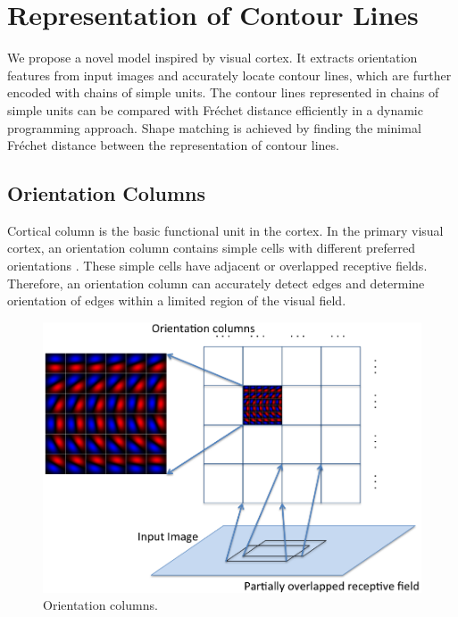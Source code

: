 \documentclass[10pt,letterpaper]{article}
\begin{document}
\section{Representation of Contour Lines}

We propose a novel model inspired by visual cortex.
It extracts orientation features from input images
and accurately locate contour lines, which are further encoded
with chains of simple units.
The contour lines represented in chains of simple units 
can be compared with Fr\'echet distance efficiently
in a dynamic programming approach.
Shape matching is achieved by finding the minimal Fr\'echet distance
between the representation of contour lines.

\subsection{Orientation Columns}

Cortical column is the basic functional unit in the cortex.
In the primary visual cortex, an orientation column contains
simple cells with different preferred orientations \cite{hubel1962}.
These simple cells have adjacent or overlapped receptive fields.
Therefore, an orientation column can accurately detect edges
and determine orientation of edges within a limited region of the visual field.

\begin{figure}[ht]
\begin{center}
\includegraphics[width=0.95\linewidth]{images/fig3.png}
\end{center}
\caption{Orientation columns.} 
\label{fig:3}
\end{figure}
\end{document}
